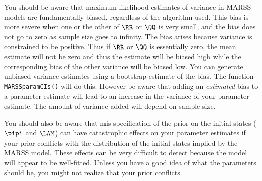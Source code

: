 You should be aware that maximum-likelihood estimates of variance in MARSS models are fundamentally biased, regardless of the algorithm used.  This bias is more severe when one or the other of $\RR$ or $\QQ$ is very small, and the bias does not go to zero as sample size goes to infinity.  The bias arises because variance is constrained to be positive.  Thus if $\RR$ or $\QQ$ is essentially zero, the mean estimate will not be zero and thus the estimate  will be biased high while the corresponding bias of the other variance will be biased low.  You can generate unbiased variance estimates using a bootstrap estimate of the bias.  The function \texttt{MARSSparamCIs()} will do this.  However be aware that adding an {\it estimated} bias to a parameter estimate will lead to an increase in the variance of your parameter estimate.  The amount of variance added will depend on sample size.

You should also be aware that mis-specification of the prior on the initial states ($\pipi$ and $\LAM$) can have catastrophic effects on your parameter estimates if your prior conflicts with the distribution of the initial states implied by the MARSS model.  These effects can be very difficult to detect because the model will appear to be well-fitted.  Unless you have a good idea of what the parameters should be, you might not realize that your prior conflicts.  

